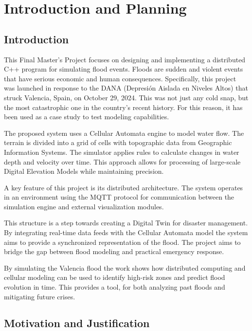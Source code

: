 \chapter{Introduction and Planning}
\label{chapter:introduccion_and_planning}

\section{Introduction}

This Final Master’s Project focuses on designing and implementing a distributed C++ program for simulating flood events. Floods are 
sudden and violent events that have serious economic and human consequences. Specifically, this project was launched in response to 
the DANA (Depresión Aislada en Niveles Altos) that struck Valencia, Spain, on October 29, 2024. This was not just any cold snap, but the most catastrophic one in the 
country’s recent history. For this reason, it has been used as a case study to test modeling capabilities.

The proposed system uses a Cellular Automata engine to model water flow. The terrain is divided into a grid of cells with topographic 
data from Geographic Information Systems. The simulator applies rules to calculate changes in water depth and velocity over time. 
This approach allows for processing of large-scale Digital Elevation Models while maintaining precision.

A key feature of this project is its distributed architecture. The system operates in an environment using the MQTT protocol for 
communication between the simulation engine and external visualization modules. 

This structure is a step towards creating a Digital Twin for disaster management. By integrating real-time data feeds with the 
Cellular Automata model the system aims to provide a synchronized representation of the flood. The project aims to bridge the gap 
between flood modeling and practical emergency response.

By simulating the Valencia flood the work shows how distributed computing and cellular modeling can be used to identify high-risk 
zones and predict flood evolution in time. This provides a tool, for both analyzing past floods and mitigating future crises.


\section{Motivation and Justification}


